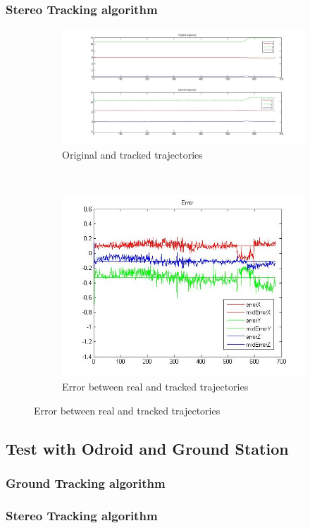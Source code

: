 		
	\subsubsection{Stereo Tracking algorithm}
	\begin{figure}[ht]
		\centering
		\begin{subfigure}[ht]{0.45\linewidth}
			\centering
				\includegraphics[width=\linewidth]{../Images/c4/trajs_stereo}
				\caption{Original and tracked trajectories}
				\label{fig:trajectories_stereo_PC}
		\end{subfigure}
		~
		\begin{subfigure}[ht]{0.45\linewidth}
			\centering
			\includegraphics[width=\linewidth]{../Images/c4/errors_stereo}
			\caption{Error between real and tracked trajectories}
			\label{fig:errors_stereo_PC}
		\end{subfigure}	
	\end{figure}

	
\subsection{Test with Odroid and Ground Station}

	\subsubsection{Ground Tracking algorithm}
	
	\subsubsection{Stereo Tracking algorithm}